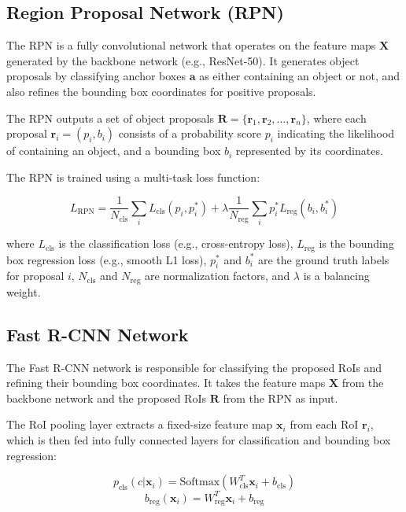 \documentclass[12pt,oneside]{book} %
\begin{document}
\subsection{Region Proposal Network (RPN)}

The RPN is a fully convolutional network that operates on the feature maps
$\mathbf{X}$ generated by the backbone network (e.g., ResNet-50). It generates
object proposals by classifying anchor boxes $\mathbf{a}$ as either containing
an object or not, and also refines the bounding box coordinates for positive
proposals.

The RPN outputs a set of object proposals $\mathbf{R} = \{\mathbf{r}_1,
    \mathbf{r}_2, \ldots, \mathbf{r}_n\}$, where each proposal $\mathbf{r}_i =
    (p_i, b_i)$ consists of a probability score $p_i$ indicating the likelihood of
containing an object, and a bounding box $b_i$ represented by its coordinates.

The RPN is trained using a multi-task loss function:

\begin{equation}
    L_{\text{RPN}} = \frac{1}{N_{\text{cls}}} \sum_{i} L_{\text{cls}}(p_i, p_i^*) + \lambda \frac{1}{N_{\text{reg}}} \sum_{i} p_i^* L_{\text{reg}}(b_i, b_i^*)
\end{equation}

where $L_{\text{cls}}$ is the classification loss (e.g., cross-entropy loss),
$L_{\text{reg}}$ is the bounding box regression loss (e.g., smooth L1 loss),
$p_i^*$ and $b_i^*$ are the ground truth labels for proposal $i$,
$N_{\text{cls}}$ and $N_{\text{reg}}$ are normalization factors, and $\lambda$
is a balancing weight.

\subsection{Fast R-CNN Network}

The Fast R-CNN network is responsible for classifying the proposed RoIs and
refining their bounding box coordinates. It takes the feature maps $\mathbf{X}$
from the backbone network and the proposed RoIs $\mathbf{R}$ from the RPN as
input.

The RoI pooling layer extracts a fixed-size feature map $\mathbf{x}_i$ from
each RoI $\mathbf{r}_i$, which is then fed into fully connected layers for
classification and bounding box regression:

\begin{equation}
    p_{\text{cls}}(c | \mathbf{x}_i) = \text{Softmax}(W_{\text{cls}}^T \mathbf{x}_i + b_{\text{cls}})
\end{equation}
\begin{equation}
    b_{\text{reg}}(\mathbf{x}_i) = W_{\text{reg}}^T \mathbf{x}_i + b_{\text{reg}}
\end{equation}
\end{document}
